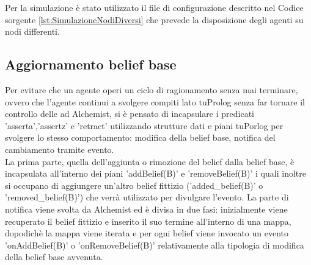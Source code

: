 \documentclass[12pt,a4paper,openright,twoside]{report}
\begin{document}
\bigskip

Per la simulazione \`e stato utilizzato il file di configurazione descritto nel Codice sorgente \ref{lst:SimulazioneNodiDiversi} che prevede la disposizione degli agenti su nodi differenti.


\subsection{Aggiornamento belief base}
Per evitare che un agente operi un ciclo di ragionamento senza mai terminare, ovvero che l'agente continui a svolgere compiti lato tuProlog senza far tornare il controllo delle ad Alchemist, si \`e pensato di incapsulare i predicati 'asserta','assertz' e 'retract' utilizzando strutture dati e piani tuPorlog per svolgere lo stesso comportamento: modifica della belief base, notifica del cambiamento tramite evento.
\\
La prima parte, quella dell'aggiunta o rimozione del belief dalla belief base, \`e incapsulata all'interno dei piani 'addBelief(B)' e 'removeBelief(B)' i quali inoltre si occupano di aggiungere un'altro belief fittizio ('added\_belief(B)' o 'removed\_belief(B)') che verr\`a utilizzato per divulgare l'evento.
La parte di notifica viene svolta da Alchemist ed \`e divisa in due fasi: inizialmente viene recuperato il belief fittizio e inserito il suo termine all'interno di una mappa, dopodich\`e la mappa viene iterata e per ogni belief viene invocato un evento 'onAddBelief(B)' o 'onRemoveBelief(B)' relativamente alla tipologia di modifica della belief base avvenuta.
\end{document}
